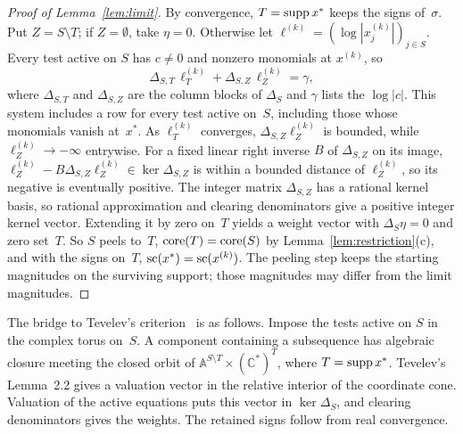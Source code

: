 \begin{proof}[Proof of Lemma~\ref{lem:limit}]
By convergence, $T=\operatorname{supp} x^*$ keeps the signs of~$\sigma$. Put
$Z=S\setminus T$; if $Z=\emptyset$, take $\eta=0$.
Otherwise let $\ell^{(k)}=(\log|x^{(k)}_j|)_{j\in S}$. Every test active
on $S$ has $c\neq0$ and nonzero monomials at $x^{(k)}$, so
\[
  \Delta_{S,T}\,\ell^{(k)}_T+\Delta_{S,Z}\,\ell^{(k)}_Z=\gamma ,
\]
where $\Delta_{S,T}$ and $\Delta_{S,Z}$ are the column blocks of $\Delta_S$
and $\gamma$ lists the $\log|c|$. This system includes a row for every test active on~$S$,
including those whose monomials vanish at~$x^*$. As $\ell^{(k)}_T$
converges, $\Delta_{S,Z}\ell^{(k)}_Z$ is bounded, while
$\ell^{(k)}_Z\to-\infty$ entrywise. For a fixed linear right inverse $B$
of $\Delta_{S,Z}$ on its image,
$\ell^{(k)}_Z-B\Delta_{S,Z}\ell^{(k)}_Z\in\ker\Delta_{S,Z}$ is within a
bounded distance of $\ell^{(k)}_Z$, so its negative is eventually
positive. The integer matrix $\Delta_{S,Z}$ has a rational kernel basis,
so rational approximation and clearing denominators give a positive
integer kernel vector. Extending it by zero on~$T$ yields a weight vector
with $\Delta_S\eta=0$ and zero set~$T$. So $S$ peels to~$T$,
$\operatorname{core}(T)=\operatorname{core}(S)$ by Lemma~\ref{lem:restriction}(c), and with the signs
on~$T$, $\operatorname{sc}(x^*)=\operatorname{sc}(x^{(k)})$. The peeling step keeps the starting
magnitudes on the surviving support; those magnitudes may differ from the
limit magnitudes.
\end{proof}

The bridge to Tevelev's criterion~\cite[Lemma~2.2]{tevelev} is as follows.
Impose the tests active on $S$ in the complex torus on~$S$. A component
containing a subsequence has algebraic closure meeting the closed orbit of
$\mathbb A^{S\setminus T}\times(\mathbb C^*)^T$, where $T=\operatorname{supp} x^*$.
Tevelev's Lemma~2.2 gives a valuation vector in the relative interior of
the coordinate cone. Valuation of the active equations puts this vector in
$\ker\Delta_S$, and clearing denominators gives the weights. The retained
signs follow from real convergence.

